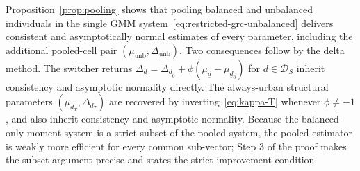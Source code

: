 Proposition~\ref{prop:pooling} shows that pooling balanced and unbalanced individuals in the single GMM system~\eqref{eq:restricted-grc-unbalanced} delivers consistent and asymptotically normal estimates of every parameter, including the additional pooled-cell pair $(\mu_{\mathrm{unb}},\Delta_{\mathrm{unb}})$.
Two consequences follow by the delta method.
The switcher returns $\Delta_{\underline d} = \Delta_{\underline d_0} + \phi(\mu_{\underline d}-\mu_{\underline d_0})$ for $\underline d \in \mathcal D_S$ inherit consistency and asymptotic normality directly.
The always-urban structural parameters $(\mu_{d_T},\Delta_{d_T})$ are recovered by inverting~\eqref{eq:kappa-T} whenever $\phi \neq -1$, and also inherit consistency and asymptotic normality.
Because the balanced-only moment system is a strict subset of the pooled system, the pooled estimator is weakly more efficient for every common sub-vector; Step 3 of the proof makes the subset argument precise and states the strict-improvement condition.

